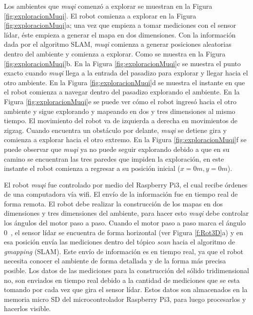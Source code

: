 Los ambientes que \textit{muqi} comenzó a explorar se muestran en la Figura 
\ref{fig:exploracionMuqi}. El robot comienza a explorar en la Figura 
\ref{fig:exploracionMuqi}a; una vez que empieza a tomar mediciones con el sensor 
lídar, éste empieza a generar el mapa en dos dimensiones. Con la información
dada por el algoritmo SLAM, \textit{muqi} comienza a generar posiciones aleatorias 
dentro del ambiente y comienza a explorar. Como se muestra en la Figura 
\ref{fig:exploracionMuqi}b. En la Figura \ref{fig:exploracionMuqi}c se muestra el 
punto exacto cuando \textit{muqi} llega a la entrada del pasadizo para explorar y 
llegar hacia el otro ambiente. En la Figura \ref{fig:exploracionMuqi}d se 
muestra el instante en que el robot comienza a navegar dentro del pasadizo explorando 
el ambiente. En la Figura \ref{fig:exploracionMuqi}e se puede ver cómo el robot ingresó 
hacia el otro ambiente y sigue explorando y mapeando en dos y tres dimensiones al 
mismo tiempo. El movimiento del robot va de izquierda a derecha en movimientos de 
zigzag. Cuando encuentra un obstáculo por delante, \textit{muqi} se detiene gira y 
comienza a explorar hacia el otro extremo. En la Figura \ref{fig:exploracionMuqi}f 
se puede observar que \textit{muqi} ya no puede seguir explorando debido a que en 
su camino se encuentran las tres paredes que impiden la exploración, en este 
instante el robot comienza a regresar a su posición inicial ($x = 0 m, y = 0 m$).

El robot \textit{muqi} fue controlado por medio del Raspberry Pi3, el 
cual recibe órdenes de una computadora vía wifi. El envío de la información fue 
en tiempo real de forma remota. El robot debe realizar la construcción de los 
mapas en dos dimensiones y tres dimensiones del ambiente, para hacer esto 
\textit{muqi} debe controlar los ángulos del motor paso a paso. Cuando el motor 
paso a paso marca el ángulo 0~\grad, el sensor lídar se encuentra de forma 
horizontal (ver Figura \ref{f:Rot3D}a) y en esa posición envía las mediciones 
dentro del tópico \textit{scan} hacia el algoritmo de \textit{gmapping} 
(SLAM). Este envío de información es en tiempo real, ya que el robot necesita 
conocer el ambiente de forma detallada y de la forma más precisa posible. Los 
datos de las mediciones para la construcción del sólido tridimensional no, son
enviados en tiempo real debido a la cantidad de mediciones que se esta tomando 
por cada vez que gira el sensor lídar. Estos datos son almacenados en la memoria 
micro SD del microcontrolador Raspberry Pi3, para luego procesarlos y hacerlos 
visible.

